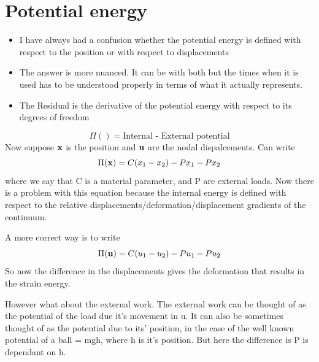 	\section{Potential energy}
	\begin{frame}
		\begin{itemize}
			\item I have always had a confusion whether the potential energy is defined with respect to the position or with respect to displacements
			\item The answer is more nuanced. It can be with both but the times when it is used has to be understood properly in terms of what it actually represents.
			\item The Residual is the derivative of the potential energy with respect to its degrees of freedom
		\end{itemize}
	\end{frame}

	\begin{frame}
		\begin{equation}
			\Pi() = \text{Internal - External potential}
		\end{equation}
		Now suppose $\mathbf{x}$ is the position and $\mathbf{u}$ are the nodal dispalcements.
		Can write
		\begin{equation}
			\Pi(\mathbf{x}) = C(x_1 - x_2)  - Px_1 - Px_2
		\end{equation}
		where we say that C is a material parameter, and P are external loads. Now there is a problem with this equation because the internal energy is defined with respect to the relative displacements/deformation/displacement gradients of the continuum. 
		
		A more correct way is to write
		\begin{equation}
		\Pi(\mathbf{u}) = C(u_1 - u_2)  - Pu_1 - Pu_2
		\end{equation}
		So now the difference in the displacements gives the deformation that results in the strain energy. 
		
		However what about the external work. The external work can be thought of as the potential of the load due it's movement in u. It can also be sometimes thought of as the potential due to its' position, in the case of the well known potential of a ball = mgh, where h is it's position. But here the difference is P is dependant on h.
	\end{frame}

